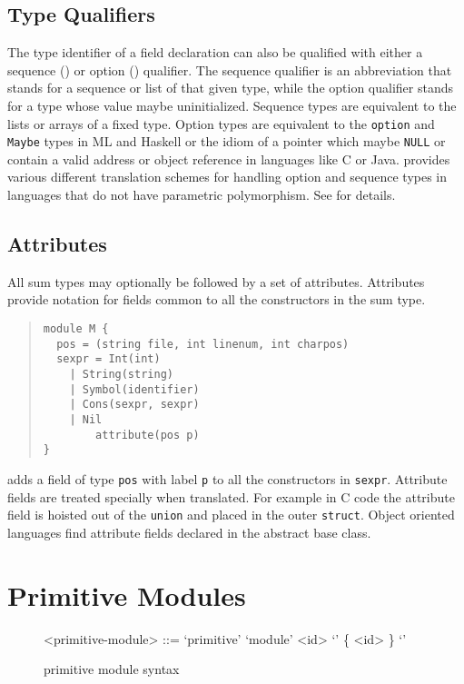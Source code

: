 \subsection{Type Qualifiers}

The type identifier of a field declaration can also be qualified with either
a sequence (\lit{*}) or option () qualifier. The sequence qualifier
is an abbreviation that stands for a sequence or list of that given type,
while the option qualifier stands for a type whose value maybe
uninitialized. Sequence types are equivalent to the lists or arrays of a
fixed type. Option types are equivalent to the \lstinline[language=ASDL]!option! and \lstinline[language=ASDL]!Maybe!
types in ML and Haskell or the idiom of a pointer which maybe \lstinline[language=ASDL]!NULL! or
contain a valid address or object reference in languages like C or Java.
\asdlgen{} provides various different translation schemes for handling option
and sequence types in languages that do not have parametric polymorphism. 
See  for details.

\subsection{Attributes}
All sum types may optionally be followed by a set of
attributes. Attributes provide notation for fields common to all the
constructors in the sum type. 
\begin{quote}\begin{lstlisting}[language=ASDL]
module M {
  pos = (string file, int linenum, int charpos)
  sexpr = Int(int)
	| String(string)
	| Symbol(identifier)
	| Cons(sexpr, sexpr)
	| Nil
        attribute(pos p)
}
\end{lstlisting}\end{quote}%
adds a field of type \lstinline[language=ASDL]!pos! with label \lstinline[language=ASDL]!p! to all the constructors in
\lstinline[language=ASDL]!sexpr!. Attribute fields are treated specially when
translated. For example in C code the attribute field is hoisted out of the
\lstinline[language=ASDL]!union! and placed in the outer \lstinline[language=ASDL]!struct!. Object oriented languages
find attribute fields declared in the abstract base class. 

\section{Primitive Modules}
\begin{figure}[ht]
  \begin{center}
    \begin{grammar}
      <primitive-module> ::= `primitive' `module' <id> `{' \{ <id> \} `}'
    \end{grammar}%
  \end{center}%
  \caption{\asdl{} primitive module syntax}
\end{figure}%

